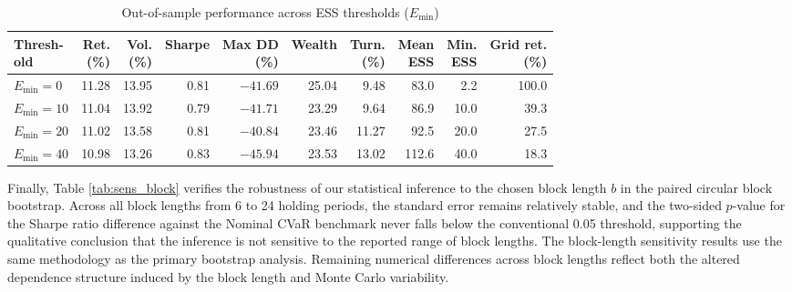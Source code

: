 \documentclass[smallcondensed]{svjour3}
\begin{document}
\begin{table}[!htbp]
\centering
\caption{Out-of-sample performance across ESS thresholds ($E_{\min}$)}
\label{tab:ess_backtest}
\footnotesize
\begin{adjustbox}{max width=\textwidth}
\begin{tabular}{lrrrrrrrrr}
\toprule
\makecell[l]{\textbf{Thresh-}\\\textbf{old}} & \makecell[r]{\textbf{Ret.}\\\textbf{(\%)}} & \makecell[r]{\textbf{Vol.}\\\textbf{(\%)}} & \textbf{Sharpe} & \makecell[r]{\textbf{Max DD}\\\textbf{(\%)}} & \textbf{Wealth} & \makecell[r]{\textbf{Turn.}\\\textbf{(\%)}} & \makecell[r]{\textbf{Mean}\\\textbf{ESS}} & \makecell[r]{\textbf{Min.}\\\textbf{ESS}} & \makecell[r]{\textbf{Grid ret.}\\\textbf{(\%)}} \\
\midrule
$E_{\min} = 0$ & 11.28 & 13.95 & 0.81 & $-41.69$ & 25.04 & 9.48 & 83.0 & 2.2 & 100.0 \\
$E_{\min} = 10$ & 11.04 & 13.92 & 0.79 & $-41.71$ & 23.29 & 9.64 & 86.9 & 10.0 & 39.3 \\
$E_{\min} = 20$ & 11.02 & 13.58 & 0.81 & $-40.84$ & 23.46 & 11.27 & 92.5 & 20.0 & 27.5 \\
$E_{\min} = 40$ & 10.98 & 13.26 & 0.83 & $-45.94$ & 23.53 & 13.02 & 112.6 & 40.0 & 18.3 \\
\bottomrule
\end{tabular}
\end{adjustbox}
\end{table}

Finally, Table \ref{tab:sens_block} verifies the robustness of our statistical inference to the chosen block length $b$ in the paired circular block bootstrap. Across all block lengths from 6 to 24 holding periods, the standard error remains relatively stable, and the two-sided $p$-value for the Sharpe ratio difference against the Nominal CVaR benchmark never falls below the conventional 0.05 threshold, supporting the qualitative conclusion that the inference is not sensitive to the reported range of block lengths. The block-length sensitivity results use the same methodology as the primary bootstrap analysis. Remaining numerical differences across block lengths reflect both the altered dependence structure induced by the block length and Monte Carlo variability.
\end{document}
